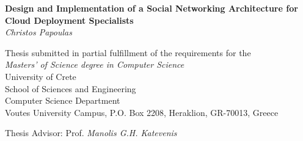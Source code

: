 \begin{titlepage}
\begin{center}

\LARGE \textbf{Design and Implementation of a Social Networking Architecture for Cloud Deployment Specialists}\\[0.5cm]
\LARGE \textit{Christos Papoulas}\\[0.5cm]

\vfill

\normalsize{
Thesis submitted in partial fulfillment of the requirements for the\\[0.30cm]

\textit{Masters' of Science degree in Computer Science}}\\[0.30cm]

University of Crete\\
School of Sciences and Engineering\\
Computer Science Department\\
Voutes University Campus, P.O. Box 2208, Heraklion, GR-70013, Greece\\[0.5cm]

\vfill

\Large{Thesis Advisor: Prof. \emph{Manolis G.H. Katevenis}}\\[0.5cm]
\vfill

\end{center}

\end{titlepage}
